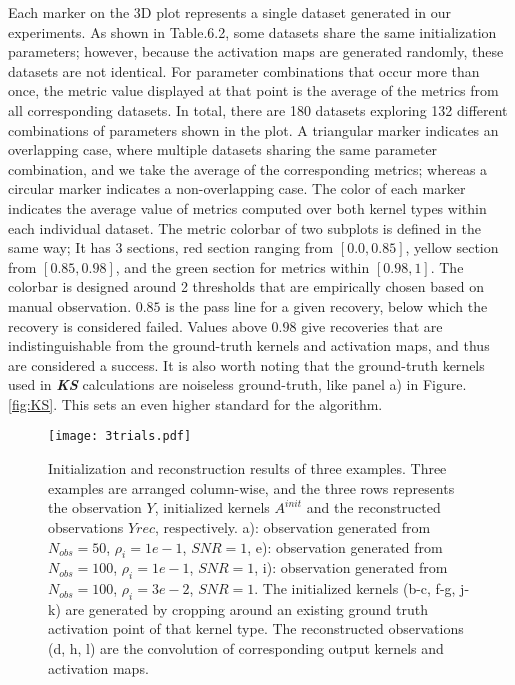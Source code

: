 Each marker on the 3D plot represents a single dataset generated in our experiments. As shown in Table.6.2, some datasets share the same initialization parameters; however, because the activation maps are generated randomly, these datasets are not identical. For parameter combinations that occur more than once, the metric value displayed at that point is the average of the metrics from all corresponding datasets. In total, there are 180 datasets exploring 132 different combinations of parameters shown in the plot. A triangular marker indicates an overlapping case, where multiple datasets sharing the same parameter combination, and we take the average of the corresponding metrics; whereas a circular marker indicates a non-overlapping case. The color of each marker indicates the average value of metrics computed over both kernel types within each individual dataset. The metric colorbar of two subplots is defined in the same way; It has 3 sections, red section ranging from $[0.0, 0.85]$, yellow section from $[0.85,0.98]$, and the green section for metrics within $[0.98,1]$. The colorbar is designed around 2 thresholds that are empirically chosen based on manual observation. $0.85$ is the pass line for a given recovery, below which the recovery is considered failed. Values above $0.98$ give recoveries that are indistinguishable from the ground-truth kernels and activation maps, and thus are considered a success. It is also worth noting that the ground-truth kernels used in \textbf{\textit{KS}} calculations are noiseless ground-truth, like panel a) in Figure. \ref{fig:KS}. This sets an even higher standard for the algorithm. 

\begin{figure}
	\texttt{[image: 3trials.pdf]} 
	\centering
	\caption{Initialization and reconstruction results of three examples. Three examples are arranged column-wise, and the three rows represents the observation $Y$, initialized kernels $A^{init}$ and the reconstructed observations $Y{rec}$, respectively. a): observation generated from $N_{obs} = 50$, $\rho_i = 1e-1$, $SNR = 1$, e): observation generated from $N_{obs} = 100$, $\rho_i = 1e-1$, $SNR = 1$, i): observation generated from $N_{obs} = 100$, $\rho_i = 3e-2$, $SNR = 1$. The initialized kernels (b-c, f-g, j-k) are generated by cropping around an existing ground truth activation point of that kernel type. The reconstructed observations (d, h, l) are the convolution of corresponding output kernels and activation maps.}
	\label{fig:regimes}
\end{figure}

